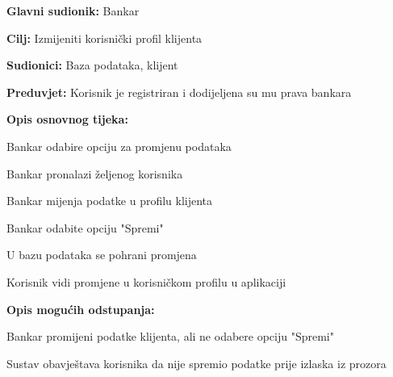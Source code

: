                 
                \noindent {}
                \begin{packed_item}
                
                  \item \textbf{Glavni sudionik: }Bankar
                  \item  \textbf{Cilj:} Izmijeniti korisnički profil klijenta 
                  \item  \textbf{Sudionici:} Baza podataka, klijent
                  \item  \textbf{Preduvjet:} Korisnik je registriran i dodijeljena su mu prava bankara
                  \item  \textbf{Opis osnovnog tijeka:}
                  
                  \item[] \begin{packed_enum}
                
                    \item  Bankar odabire opciju za promjenu podataka
                    \item  Bankar pronalazi željenog korisnika
                    \item  Bankar mijenja podatke u profilu klijenta
                    \item  Bankar odabite opciju "Spremi"
                    \item  U bazu podataka se pohrani promjena                     
                    \item  Korisnik vidi promjene u korisničkom profilu u aplikaciji 
                  \end{packed_enum}
                  
                  \item  \textbf{Opis mogućih odstupanja:}
                  
                  \item[] \begin{packed_item}
                
                    \item[4.a] Bankar promijeni podatke klijenta, ali ne odabere opciju "Spremi" 
                    \item[] \begin{packed_enum}
                      
                      \item  Sustav obavještava korisnika da nije spremio podatke prije izlaska iz prozora
                      
                    \end{packed_enum}
                  
                \end{packed_item}
            \end{packed_item}
        
